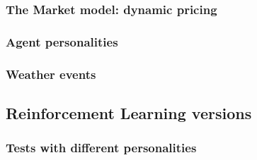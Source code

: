 \documentclass[10pt, aspectratio=169]{beamer}
\def\aac{The Market model: dynamic pricing}
\def\aad{Agent personalities}
\def\aae{Weather events}
\def\ab{Reinforcement Learning versions}
\def\abb{Tests with different personalities}
\begin{document}
\subsubsection{\aac}
\subsubsection{\aad}
\subsubsection{\aae}

\subsection{\ab}


\subsubsection{\abb}
\end{document}
